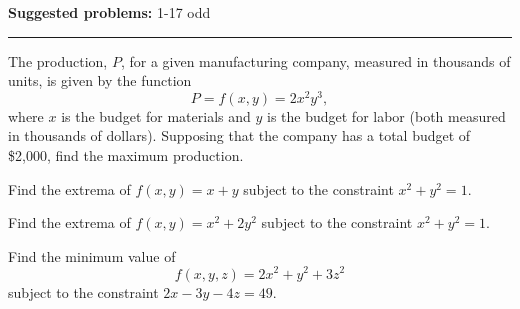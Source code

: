 \documentclass[12pt,reqno]{amsart}
\begin{document}
\textbf{Suggested problems:} 1-17 odd

\bigskip
\hrule

\bigskip

\prob The production, $P$, for a given manufacturing company, measured in thousands of units, is given by the function
	\[P = f(x,y) = 2x^2y^3,
	\]
where $x$ is the budget for materials and $y$ is the budget for labor (both measured in thousands of dollars). Supposing that the company has a total budget of \$2,000, find the maximum production.


\vfill
\prob Find the extrema of $f(x,y) = x+y$ subject to the constraint $x^2+y^2=1$.

\vfill
\newpage
\prob Find the extrema of $f(x,y) = x^2+2y^2$ subject to the constraint $x^2+y^2 = 1$.

\vfill
\prob Find the minimum value of
	\[f(x,y,z) = 2x^2 + y^2 + 3z^2
	\]
subject to the constraint $2x-3y-4z=49$.
\vfill
\end{document}
